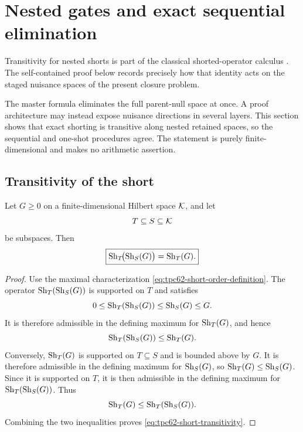 \section{Nested gates and exact sequential elimination}
\label{sec:tpc62-nested-gates}

Transitivity for nested shorts is part of the classical shorted-operator
calculus \citep{Anderson1971,AndersonTrapp1975}.  The self-contained proof
below records precisely how that identity acts on the staged nuisance
spaces of the present closure problem.

The master formula eliminates the full parent-null space at once.  A
proof architecture may instead expose nuisance directions in several
layers.  This section shows that exact shorting is transitive along nested
retained spaces, so the sequential and one-shot procedures agree.  The
statement is purely finite-dimensional and makes no arithmetic assertion.

\subsection{Transitivity of the short}

\begin{theorem}
\label{thm:tpc62-short-transitivity}
Let \(G\ge0\) on a finite-dimensional Hilbert space \(\mathcal K\), and let
\begin{equation}
 T\subseteq S\subseteq\mathcal K
 \label{eq:tpc62-nested-two-spaces}
\end{equation}
be subspaces.  Then
\begin{equation}
 \boxed{
 \operatorname{Sh}_T\!\bigl(\operatorname{Sh}_S(G)\bigr)=\operatorname{Sh}_T(G).}
 \label{eq:tpc62-short-transitivity}
\end{equation}
\end{theorem}

\begin{proof}
Use the maximal characterization
\eqref{eq:tpc62-short-order-definition}.  The operator
\(\operatorname{Sh}_T(\operatorname{Sh}_S(G))\) is supported on \(T\) and satisfies
\[
 0\le\operatorname{Sh}_T(\operatorname{Sh}_S(G))\le\operatorname{Sh}_S(G)\le G.
\]
It is therefore admissible in the defining maximum for \(\operatorname{Sh}_T(G)\), and
hence
\begin{equation}
 \operatorname{Sh}_T(\operatorname{Sh}_S(G))\le\operatorname{Sh}_T(G).
 \label{eq:tpc62-transitivity-first-order}
\end{equation}
Conversely, \(\operatorname{Sh}_T(G)\) is supported on \(T\subseteq S\) and is bounded
above by \(G\).  It is therefore admissible in the defining maximum for
\(\operatorname{Sh}_S(G)\), so \(\operatorname{Sh}_T(G)\le\operatorname{Sh}_S(G)\).  Since it is supported on
\(T\), it is then admissible in the defining maximum for
\(\operatorname{Sh}_T(\operatorname{Sh}_S(G))\).  Thus
\begin{equation}
 \operatorname{Sh}_T(G)\le\operatorname{Sh}_T(\operatorname{Sh}_S(G)).
 \label{eq:tpc62-transitivity-second-order}
\end{equation}
Combining the two inequalities proves
\eqref{eq:tpc62-short-transitivity}.
\end{proof}

